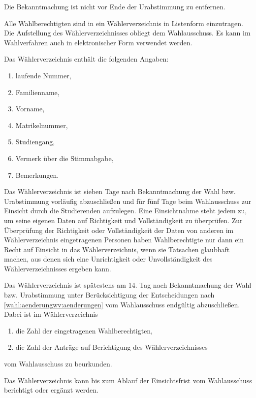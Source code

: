 \begin{jurdoc}
Die Bekanntmachung ist nicht vor Ende der Urabstimmung zu entfernen.

\label{wahl:wählernverzeichnis}

Alle Wahlberechtigten sind in ein Wählerverzeichnis in Listenform einzutragen. Die Aufstellung des Wählerverzeichnisses obliegt dem  Wahlausschuss. Es kann im Wahlverfahren auch in elektronischer Form  verwendet werden.

Das Wählerverzeichnis enthält die folgenden Angaben:
\begin{enumerate}
\item laufende Nummer,
\item Familienname,
\item Vorname,
\item Matrikelnummer,
\item Studiengang,
\item Vermerk über die Stimmabgabe,
\item Bemerkungen.
\end{enumerate}

Das Wählerverzeichnis ist sieben Tage nach Bekanntmachung der Wahl bzw. Urabstimmung vorläufig  abzuschließen und für fünf Tage beim Wahlausschuss zur Einsicht durch die Studierenden aufzulegen. Eine Einsichtnahme steht jedem zu, um seine  eigenen Daten auf Richtigkeit und Vollständigkeit zu überprüfen. Zur Überprüfung der Richtigkeit oder Vollständigkeit der Daten von anderen im Wählerverzeichnis eingetragenen Personen haben Wahlberechtigte nur dann ein Recht auf Einsicht in das Wählerverzeichnis, wenn sie Tatsachen glaubhaft machen, aus denen sich eine Unrichtigkeit oder Unvollständigkeit des Wählerverzeichnisses ergeben kann.  \label{wahl:wählerverzeichnis:auflegung}

Das Wählerverzeichnis ist spätestens am 14. Tag nach Bekanntmachung der Wahl bzw. Urabstimmung  unter Berücksichtigung der Entscheidungen nach  \ref{wahl:aenderungwv:aenderungen} vom Wahlausschuss endgültig  abzuschließen. Dabei ist im Wählerverzeichnis
\begin{enumerate}
\item die Zahl der eingetragenen Wahlberechtigten,
\item die Zahl der Anträge auf Berichtigung des Wählerverzeichnisses
\end{enumerate}
vom Wahlausschuss zu beurkunden.

Das Wählerverzeichnis kann bis zum Ablauf der Einsichtsfrist vom Wahlausschuss berichtigt oder ergänzt werden.


\end{jurdoc}
